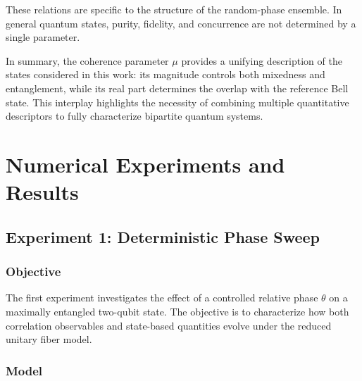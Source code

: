 \documentclass[a4paper]{article}
\begin{document}
\medskip

These relations are specific to the structure of the random-phase ensemble. In general quantum states, purity, fidelity, and concurrence are not determined by a single parameter.

\medskip

In summary, the coherence parameter \( \mu \) provides a unifying description of the states considered in this work: its magnitude controls both mixedness and entanglement, while its real part determines the overlap with the reference Bell state. This interplay highlights the necessity of combining multiple quantitative descriptors to fully characterize bipartite quantum systems.



\section{Numerical Experiments and Results}


\subsection{Experiment 1: Deterministic Phase Sweep}


\subsubsection{Objective}

The first experiment investigates the effect of a controlled relative phase \( \theta \) on a maximally entangled two-qubit state. The objective is to characterize how both correlation observables and state-based quantities evolve under the reduced unitary fiber model.


\subsubsection{Model}
\end{document}
